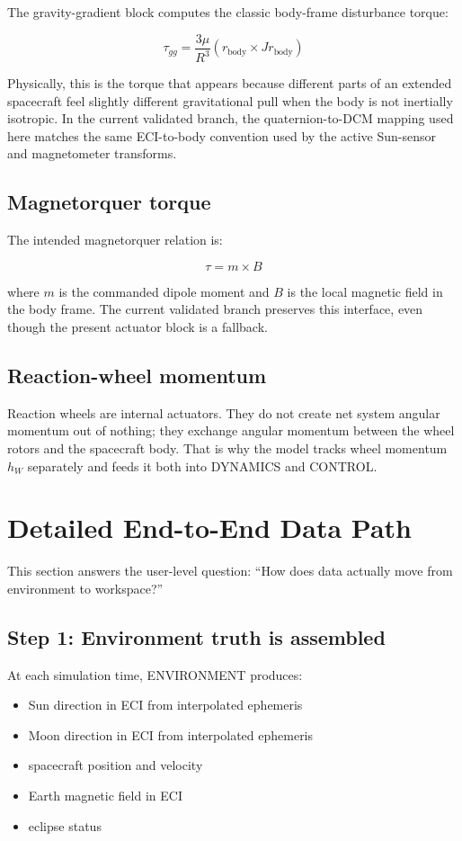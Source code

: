 \documentclass[11pt]{article}
\begin{document}
The gravity-gradient block computes the classic body-frame disturbance torque:

\[
\tau_{gg} = \frac{3\mu}{R^3}\left(r_{\text{body}} \times J r_{\text{body}}\right)
\]

Physically, this is the torque that appears because different parts of an extended spacecraft feel slightly different gravitational pull when the body is not inertially isotropic. In the current validated branch, the quaternion-to-DCM mapping used here matches the same ECI-to-body convention used by the active Sun-sensor and magnetometer transforms.

\subsection{Magnetorquer torque}

The intended magnetorquer relation is:

\[
\tau = m \times B
\]

where \(m\) is the commanded dipole moment and \(B\) is the local magnetic field in the body frame. The current validated branch preserves this interface, even though the present actuator block is a fallback.

\subsection{Reaction-wheel momentum}

Reaction wheels are internal actuators. They do not create net system angular momentum out of nothing; they exchange angular momentum between the wheel rotors and the spacecraft body. That is why the model tracks wheel momentum \(h_W\) separately and feeds it both into DYNAMICS and CONTROL.

\section{Detailed End-to-End Data Path}

This section answers the user-level question: ``How does data actually move from environment to workspace?''

\subsection{Step 1: Environment truth is assembled}

At each simulation time, ENVIRONMENT produces:

\begin{itemize}
\item Sun direction in ECI from interpolated ephemeris
\item Moon direction in ECI from interpolated ephemeris
\item spacecraft position and velocity
\item Earth magnetic field in ECI
\item eclipse status
\end{itemize}
\end{document}
